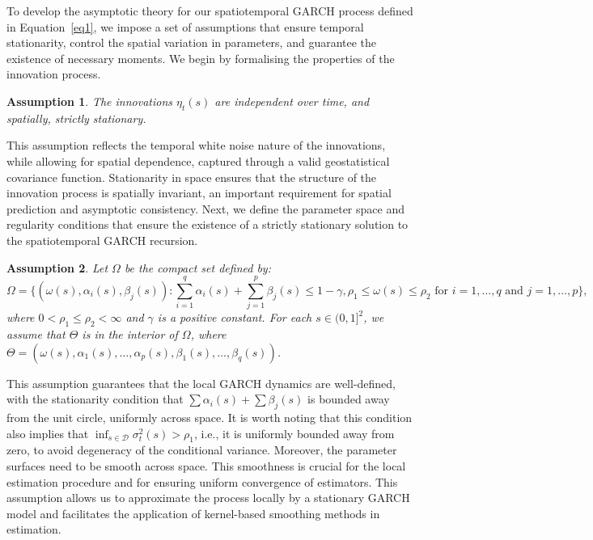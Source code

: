 \documentclass[fleqn,11pt]{article}
\newtheorem{assumption}{Assumption}
\begin{document}
To develop the asymptotic theory for our spatiotemporal GARCH process defined in Equation~\eqref{eq1}, we impose a set of assumptions that ensure temporal stationarity, control the spatial variation in parameters, and guarantee the existence of necessary moments. We begin by formalising the properties of the innovation process.

\begin{assumption}\label{ass1}
  The innovations $ \eta_t(s) $ are independent over time, and spatially, strictly stationary. 
\end{assumption}

This assumption reflects the temporal white noise nature of the innovations, while allowing for spatial dependence, captured through a valid geostatistical covariance function. Stationarity in space ensures that the  structure of the innovation process is spatially invariant, an important requirement for spatial prediction and asymptotic consistency. Next, we define the parameter space and regularity conditions that ensure the existence of a strictly stationary solution to the spatiotemporal GARCH recursion.

\begin{assumption}\label{ass2} 
Let \( \Omega \) be the compact set defined by:
\begin{equation}
    \Omega= \{ (\omega(s), \alpha_i(s), \beta_j(s)) : \sum_{i=1}^{q} \alpha_i(s) + \sum_{j=1}^{p} \beta_j(s) \leq 1 - \gamma, \rho_1 \leq \omega(s) \leq \rho_2 \text{ for } i = 1, \ldots, q \text{ and } j = 1, \ldots, p \},
\end{equation}
where \(0 < \rho_1 \leq \rho_2 < \infty\) and $\gamma$ is a positive constant. For each \(s \in (0,1]^2\), we assume that \(\Theta\) is in the interior of \(\Omega\), where \(\Theta = (\omega(s), \alpha_1(s), \ldots, \alpha_p(s), \beta_1(s),\dots ,\beta_q(s))\).
\end{assumption}

This assumption guarantees that the local GARCH dynamics are well-defined, with the stationarity condition that $\sum \alpha_i(s) + \sum \beta_j(s)$ is bounded away from the unit circle,  uniformly across space. It is worth noting that this condition also implies that $ \inf_{s \in \mathcal{D}} \sigma_t^2(s) > \rho_1$, i.e., it is uniformly bounded away from zero, to avoid degeneracy of the conditional variance. Moreover, the parameter surfaces need to be smooth across space. This smoothness is crucial for the local estimation procedure and for ensuring uniform convergence of estimators. This assumption allows us to approximate the process locally by a stationary GARCH model and facilitates the application of kernel-based smoothing methods in estimation.
\end{document}
